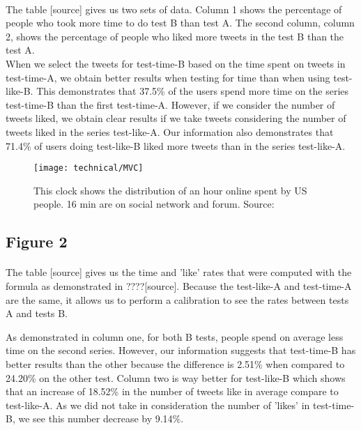 \paragraph{}
The table [source] gives us two sets of data. Column 1 shows the percentage of people who took more time to do test B than test A. The second column, column 2, shows the percentage of people who liked more tweets in the test B than the test A.\\
When we select the tweets for test-time-B based on the time spent on tweets in test-time-A, we obtain better results when testing for time than when using test-like-B. This demonstrates that 37.5\% of the users spend more time on the series test-time-B than the first test-time-A. However, if we consider the number of tweets liked, we obtain clear results if we take tweets considering the number of tweets liked in the series test-like-A. Our information also demonstrates that 71.4\% of users doing test-like-B liked more tweets than in the series test-like-A.

\begin{figure}[h] 
\centering 
\texttt{[image: technical/MVC]} 
\caption[Time spent of Social Media]{This clock shows the distribution of an hour online spent by US people. 16 min are on social network and forum. Source: \cite{s_clock}}
\label{fig:tinder} 
\end{figure}

\subsection{Figure 2}

\paragraph{}
The table [source] gives us the time and 'like' rates that were computed with the formula as demonstrated in ????[source]. Because the test-like-A and test-time-A are the same, it allows us to perform a calibration to see the rates between tests A and tests B.

As demonstrated in column one, for both B tests, people spend on average less time on the second series. However, our information suggests that test-time-B has better results than the other because the difference is 2.51\% when compared to 24.20\% on the other test.
Column two is way better for test-like-B which shows that an increase of 18.52\% in the number of tweets like in average compare to test-like-A. As we did not take in consideration the number of 'likes' in test-time-B, we see this number decrease by 9.14\%.

